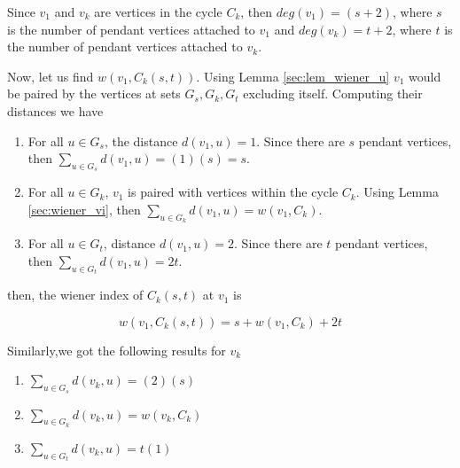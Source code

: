 
\proof
Since $v_1$ and $v_k$ are vertices in the cycle $C_k$, then $deg(v_1)=(s+2)$, where $s$ is the number of pendant vertices attached to $v_1$ and $deg(v_k)=t+2$, where $t$ is the number of pendant vertices attached to $v_k$. 

Now, let us find $w(v_1,C_k(s,t))$. Using Lemma \href{chap2.tex}{\ref{sec:lem_wiener_u}} $v_1$ would be paired by the vertices at sets $G_s,G_k,G_t$ excluding itself. Computing their distances we have \medskip

\begin{enumerate}
\item {For all $u\in G_s$, the distance $d(v_1,u)=1$. Since there are $s$ pendant vertices, then $\sum_{u\in G_s}d(v_1,u)=(1)(s)=s$.
}
\item {For all $u\in G_k$, $v_1$ is paired with vertices within the cycle $C_k$. Using Lemma \href{chap2.tex}{\ref{sec:wiener_vi}}, then $\sum_{u\in G_k}d(v_1,u)=w(v_1,C_k)$. 
}
\item {For all $u\in G_t$, distance $d(v_1,u)=2$. Since there are $t$ pendant vertices, then $\sum_{u\in G_t}d(v_1,u)=2t$.
}
\end{enumerate}  

then, the wiener index of $C_k(s,t)$ at $v_1$ is

\begin{equation}
w(v_1,C_k(s,t))=s+w(v_1,C_k)+2t
\label{wiener_v1}
\end{equation}

Similarly,we got the following results for $v_k$

\begin{enumerate}
\item $\sum_{u\in G_s}d(v_k,u)=(2)(s)$
\item $\sum_{u\in G_k}d(v_k,u)=w(v_k,C_k)$
\item $\sum_{u\in G_t}d(v_k,u)=t(1)$
\end{enumerate}  

